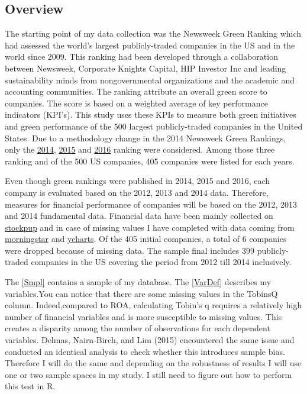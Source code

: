 \documentclass[12pt,]{article}
\begin{document}
\subsection{Overview}\label{overview}

The starting point of my data collection was the Newsweek Green Ranking
which had assessed the world's largest publicly-traded companies in the
US and in the world since 2009. This ranking had been developed through
a collaboration between Newsweek, Corporate Knights Capital, HIP
Investor Inc and leading sustainability minds from nongovernmental
organizations and the academic and accounting communities. The ranking
attribute an overall green score to companies. The score is based on a
weighted average of key performance indicators (KPI's). This study uses
these KPIs to measure both green initiatives and green performance of
the 500 largest publicly-traded companies in the United States. Due to a
methodology change in the 2014 Newsweek Green Rankings, only the
\href{http://www.newsweek.com/green/worlds-greenest-companies-2014}{2014},
\href{http://www.newsweek.com/green-2015/top-green-companies-world-2015}{2015}
and
\href{http://www.newsweek.com/green-2016/top-green-companies-world-2016}{2016}
ranking were considered. Among those three ranking and of the 500 US
companies, 405 companies were listed for each years.

Even though green rankings were published in 2014, 2015 and 2016, each
company is evaluated based on the 2012, 2013 and 2014 data. Therefore,
measures for financial performance of companies will be based on the
2012, 2013 and 2014 fundamental data. Financial data have been mainly
collected on \href{http://www.stockpup.com/}{stockpup} and in case of
missing values I have completed with data coming from
\href{http://www.morningstar.be/be/default.aspx}{morningstar} and
\href{https://ycharts.com/}{ycharts}. Of the 405 initial companies, a
total of 6 companies were dropped because of missing data. The sample
final includes 399 publicly-traded companies in the US covering the
period from 2012 till 2014 inclusively.

The \autoref{Smpl} contains a sample of my database. The
\autoref{VarDef} describes my variables.You can notice that there are
some missing values in the TobinsQ column. Indeed,compared to ROA,
calculating Tobin's q requires a relatively high number of financial
variables and is more susceptible to missing values. This creates a
disparity among the number of observations for each dependent variables.
Delmas, Nairn-Birch, and Lim (2015) encountered the same issue and
conducted an identical analysis to check whether this introduces sample
bias. Therefore I will do the same and depending on the robustness of
results I will use one or two sample spaces in my study. I still need to
figure out how to perform this test in R.
\end{document}

